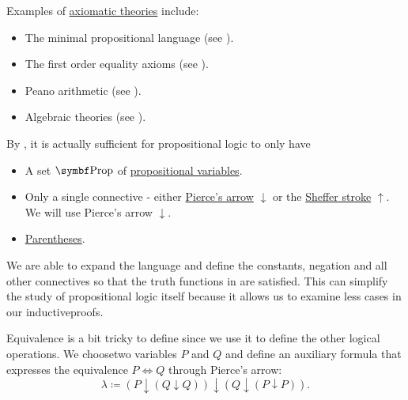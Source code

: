 \begin{example}\label{ex:axiomatic_theory}
  Examples of \hyperref[def:propositional_theory]{axiomatic theories} include:
  \begin{itemize}
    \item The minimal propositional language (see ).
    \item The first order equality axioms (see ).
    \item Peano arithmetic (see ).
    \item Algebraic theories (see ).
  \end{itemize}
\end{example}

\begin{remark}\label{remark:minimal_propositional_language}
  By , it is actually sufficient for propositional logic to only have
  \begin{itemize}
    \item A set \( \Bold{Prop} \) of \hyperref[def:propositional_language/prop]{propositional variables}.
    \item Only a single connective - either \hyperref[def:propositional_language/pierce_arrow]{Pierce's arrow} \( \downarrow \) or the \hyperref[def:propositional_language/sheffer_stroke]{Sheffer stroke} \( \uparrow \). We will use Pierce's arrow \( \downarrow \).
    \item \hyperref[def:propositional_language/parentheses]{Parentheses}.
  \end{itemize}

  We are able to expand the language and define the constants, negation and all other connectives so that the truth functions in  are satisfied. This can simplify the study of propositional logic itself because it allows us to examine less cases in our inductive\IND proofs.

  Equivalence is a bit tricky to define since we use it to define the other logical operations. We choose\AOC two variables \( P \) and \( Q \) and define an auxiliary formula that expresses the equivalence \( P \iff Q \) through Pierce's arrow:
  \begin{equation*}
    \lambda \coloneqq (P \downarrow (Q \downarrow Q)) \downarrow (Q \downarrow (P \downarrow P)).
  \end{equation*}


\end{remark}
